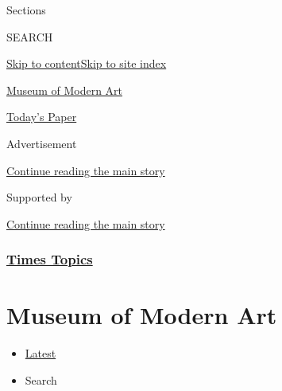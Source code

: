 Sections

SEARCH

\protect\hyperlink{site-content}{Skip to
content}\protect\hyperlink{site-index}{Skip to site index}

\href{https://www.nytimes3xbfgragh.onion/topic/organization/museum-of-modern-art}{Museum
of Modern Art}

\href{https://myaccount.nytimes3xbfgragh.onion/auth/login?response_type=cookie\&client_id=vi}{}

\href{https://www.nytimes3xbfgragh.onion/section/todayspaper}{Today's
Paper}

Advertisement

\protect\hyperlink{after-top}{Continue reading the main story}

Supported by

\protect\hyperlink{after-sponsor}{Continue reading the main story}

\hypertarget{times-topics}{%
\subsubsection{\texorpdfstring{\href{/index.html}{Times
Topics}}{Times Topics}}\label{times-topics}}

\hypertarget{museum-of-modern-art}{%
\section{Museum of Modern Art}\label{museum-of-modern-art}}

\begin{itemize}
\tightlist
\item
  \protect\hyperlink{stream-panel}{Latest}
\item
  Search
\end{itemize}

